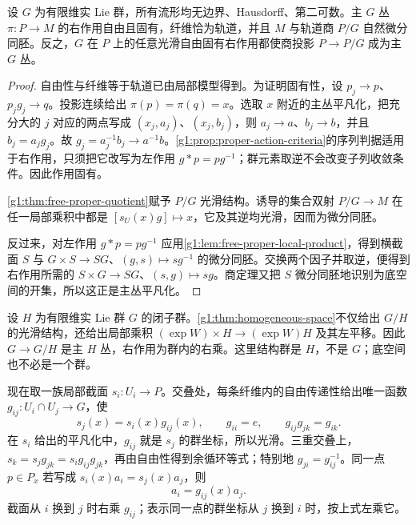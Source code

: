 \begin{proposition}\label{g1:prop:principal-free-proper}
	设 \(G\) 为有限维实 Lie 群，所有流形均无边界、Hausdorff、第二可数。主 \(G\) 丛 \(\pi:P\to M\) 的右作用自由且固有，纤维恰为轨道，并且 \(M\) 与轨道商 \(P/G\) 自然微分同胚。反之，\(G\) 在 \(P\) 上的任意光滑自由固有右作用都使商投影 \(P\to P/G\) 成为主 \(G\) 丛。
\end{proposition}
\begin{proof}
	自由性与纤维等于轨道已由局部模型得到。为证明固有性，设 \(p_j\to p\)、\(p_jg_j\to q\)。投影连续给出 \(\pi(p)=\pi(q)=x\)。选取 \(x\) 附近的主丛平凡化，把充分大的 \(j\) 对应的两点写成 \((x_j,a_j)\)、\((x_j,b_j)\)，则 \(a_j\to a\)、\(b_j\to b\)，并且 \(b_j=a_jg_j\)。故 \(g_j=a_j^{-1}b_j\to a^{-1}b\)。\cref{g1:prop:proper-action-criteria}的序列判据适用于右作用，只须把它改写为左作用 \(g*p=pg^{-1}\)；群元素取逆不会改变子列收敛条件。因此作用固有。

	\cref{g1:thm:free-proper-quotient}赋予 \(P/G\) 光滑结构。诱导的集合双射 \(P/G\to M\) 在任一局部乘积中都是 \([s_U(x)g]\mapsto x\)，它及其逆均光滑，因而为微分同胚。

	反过来，对左作用 \(g*p=pg^{-1}\) 应用\cref{g1:lem:free-proper-local-product}，得到横截面 \(S\) 与 \(G\times S\to SG\)、\((g,s)\mapsto sg^{-1}\) 的微分同胚。交换两个因子并取逆，便得到右作用所需的 \(S\times G\to SG\)、\((s,g)\mapsto sg\)。商定理又把 \(S\) 微分同胚地识别为底空间的开集，所以这正是主丛平凡化。
\end{proof}

\begin{example}\label{g1:exm:homogeneous-principal-bundle}
	设 \(H\) 为有限维实 Lie 群 \(G\) 的闭子群。\cref{g1:thm:homogeneous-space}不仅给出 \(G/H\) 的光滑结构，还给出局部乘积 \((\exp W)\times H\to(\exp W)H\) 及其左平移。因此 \(G\to G/H\) 是主 \(H\) 丛，右作用为群内的右乘。这里结构群是 \(H\)，不是 \(G\)；底空间也不必是一个群。
\end{example}

现在取一族局部截面 \(s_i:U_i\to P\)。交叠处，每条纤维内的自由传递性给出唯一函数 \(g_{ij}:U_i\cap U_j\to G\)，使
\begin{equation}\label{g1:eq:principal-transition}
	s_j(x)=s_i(x)g_{ij}(x),\qquad
	g_{ii}=e,\qquad g_{ij}g_{jk}=g_{ik}.
\end{equation}
在 \(s_i\) 给出的平凡化中，\(g_{ij}\) 就是 \(s_j\) 的群坐标，所以光滑。三重交叠上，\(s_k=s_jg_{jk}=s_i g_{ij}g_{jk}\)，再由自由性得到余循环等式；特别地 \(g_{ji}=g_{ij}^{-1}\)。同一点 \(p\in P_x\) 若写成 \(s_i(x)a_i=s_j(x)a_j\)，则
\begin{equation}\label{g1:eq:principal-coordinate-transition}
	a_i=g_{ij}(x)a_j.
\end{equation}
截面从 \(i\) 换到 \(j\) 时右乘 \(g_{ij}\)；表示同一点的群坐标从 \(j\) 换到 \(i\) 时，按上式左乘它。

